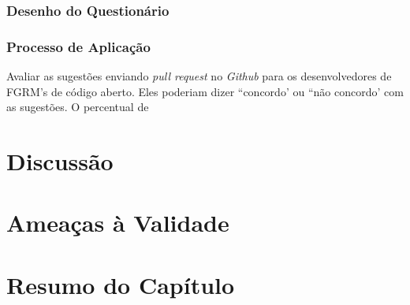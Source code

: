 \subsubsection{Desenho do Questionário}
\label{ssub:sug_melhoria_desenho_questionario}


\subsubsection{Processo de Aplicação}
\label{ssub:processo_de_aplicação}







Avaliar as sugestões enviando \textit{pull request} no \textit{Github} para os
desenvolvedores de FGRM's de código aberto. Eles poderiam dizer ``concordo' ou
``não concordo' com as sugestões. O percentual de

\section{Discussão}
\label{sec:sug_melhoria_discussao}

\section{Ameaças à Validade}
\label{sec:sug_melhoria_ameacas}

\section{Resumo do Capítulo}
\label{sec:sug_melhoria_resumo}
